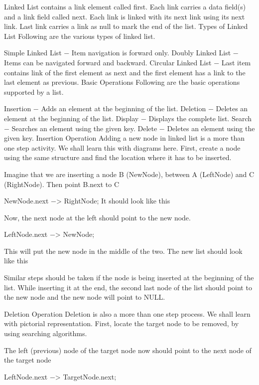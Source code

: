 Linked List contains a link element called first.
Each link carries a data field(s) and a link field called next.
Each link is linked with its next link using its next link.
Last link carries a link as null to mark the end of the list.
Types of Linked List
Following are the various types of linked list.

Simple Linked List − Item navigation is forward only.
Doubly Linked List − Items can be navigated forward and backward.
Circular Linked List − Last item contains link of the first element as next and the first element has a link to the last element as previous.
Basic Operations
Following are the basic operations supported by a list.

Insertion − Adds an element at the beginning of the list.
Deletion − Deletes an element at the beginning of the list.
Display − Displays the complete list.
Search − Searches an element using the given key.
Delete − Deletes an element using the given key.
Insertion Operation
Adding a new node in linked list is a more than one step activity. We shall learn this with diagrams here. First, create a node using the same structure and find the location where it has to be inserted.



Imagine that we are inserting a node B (NewNode), between A (LeftNode) and C (RightNode). Then point B.next to C

NewNode.next −> RightNode;
It should look like this



Now, the next node at the left should point to the new node.

LeftNode.next −> NewNode;


This will put the new node in the middle of the two. The new list should look like this



Similar steps should be taken if the node is being inserted at the beginning of the list. While inserting it at the end, the second last node of the list should point to the new node and the new node will point to NULL.

Deletion Operation
Deletion is also a more than one step process. We shall learn with pictorial representation. First, locate the target node to be removed, by using searching algorithms.



The left (previous) node of the target node now should point to the next node of the target node

LeftNode.next −> TargetNode.next;


